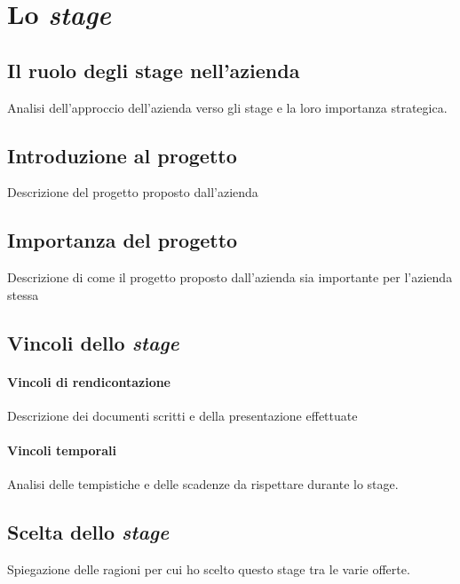 \chapter{Lo \textit{stage}}
\label{cap:lo-stage}

\section{Il ruolo degli stage nell'azienda}
Analisi dell'approccio dell'azienda verso gli stage e la loro importanza strategica.

\section{Introduzione al progetto}
Descrizione del progetto proposto dall'azienda

\section{Importanza del progetto}
Descrizione di come il progetto proposto dall'azienda sia importante per l'azienda stessa

\section{Vincoli dello \textit{stage}}
\subsubsection{Vincoli di rendicontazione}
Descrizione dei documenti scritti e della presentazione effettuate
\subsubsection{Vincoli temporali}
Analisi delle tempistiche e delle scadenze da rispettare durante lo stage.


\section{Scelta dello \textit{stage}}
Spiegazione delle ragioni per cui ho scelto questo stage tra le varie offerte.
